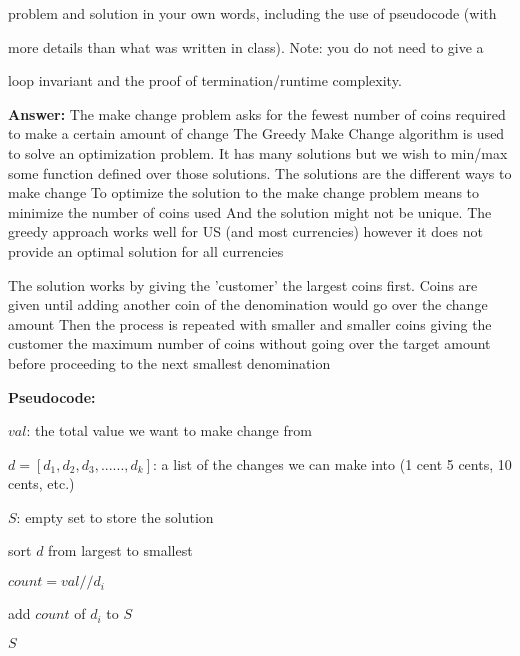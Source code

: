 \documentclass{article}
\begin{document}
problem and solution in your own words, including the use of pseudocode (with

more details than what was written in class).  Note: you do not need to give a

loop invariant and the proof of termination/runtime complexity.



\textbf{Answer:} The make change problem asks for the fewest number of coins required to make a certain amount of change
 The Greedy Make Change algorithm is used to solve an optimization problem. It has many solutions
 but we wish to min/max some function defined over those solutions. The solutions are the different ways to make change
 To optimize the solution to the make change problem means to minimize the number of coins used
 And the solution might not be unique. The greedy approach works well for US (and most currencies) however it does not provide an optimal solution for all currencies


The solution works by giving the 'customer' the largest coins first. Coins are given until adding another coin of the denomination would go over the change amount
 Then the process is repeated with smaller and smaller coins giving the customer the maximum number of coins without going over the target amount before proceeding to the next smallest denomination


\textbf{Pseudocode:}

\begin{algorithm}

            \begin{algorithmic}

            \State $val$: the total value we want to make change from

            \State $d = [d_1, d_2, d_3, ......, d_k]$: a list of the changes we can make into (1 cent
 5 cents, 10 cents, etc.)


                    \State $S$: empty set to store the solution

                    \State sort $d$ from largest to smallest


                        \State $count = val // d_i$

                        \State add $count$ of $d_i$ to $S$  

                    \EndFor

                    \newline

                    \Return $S$

                \EndFunction

            \end{algorithmic}

            \end{algorithm}
\end{document}
